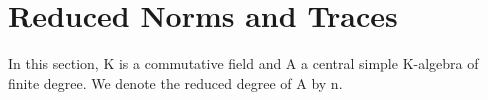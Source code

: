 \section{Reduced Norms and Traces}

In this section, K is a commutative field and A a central simple K-algebra of finite degree. We denote the reduced degree of A by n.

